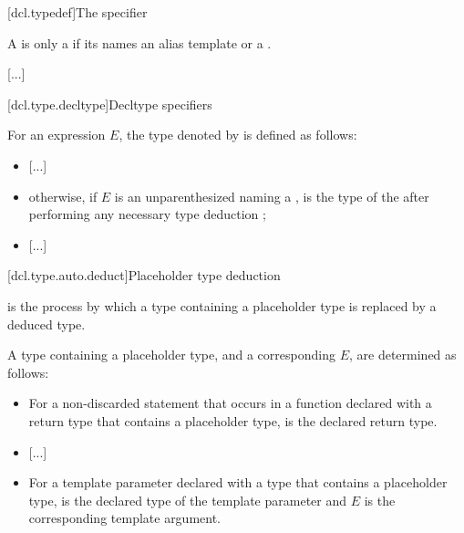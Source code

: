 \documentclass{wg21}
\begin{document}
[dcl.typedef]{The  specifier}%


\pnum
{}%
A  is only a 
if its  names
an alias template or a .
\begin{note}
    \textcolor{noteclr}{[...]}
\end{note}

[dcl.type.decltype]{Decltype specifiers}%
%

%
For an expression $E$, the type denoted by  is defined as follows:
\begin{itemize}
\item \textcolor{noteclr}{[...]}

\item otherwise, if $E$ is an unparenthesized 
naming a  ,
 is the type of the\linebreak
{}
after performing any necessary
type deduction ;

\item \textcolor{noteclr}{[...]}
\end{itemize}

[dcl.type.auto.deduct]{Placeholder type deduction}
%

\pnum
{}
is the process by which
a type containing a placeholder type
is replaced by a deduced type.

\pnum
A type  containing a placeholder type,
and a corresponding  $E$,
are determined as follows:
\begin{itemize}
\item
For a non-discarded  statement that occurs
in a function declared with a return type
that contains a placeholder type,
 is the declared return type.

\item \textcolor{noteclr}{[...]}

\item
For a  template parameter declared with a type
that contains a placeholder type,
 is the declared type of the  template parameter
and $E$ is the corresponding template argument.
\end{itemize}
\end{document}

